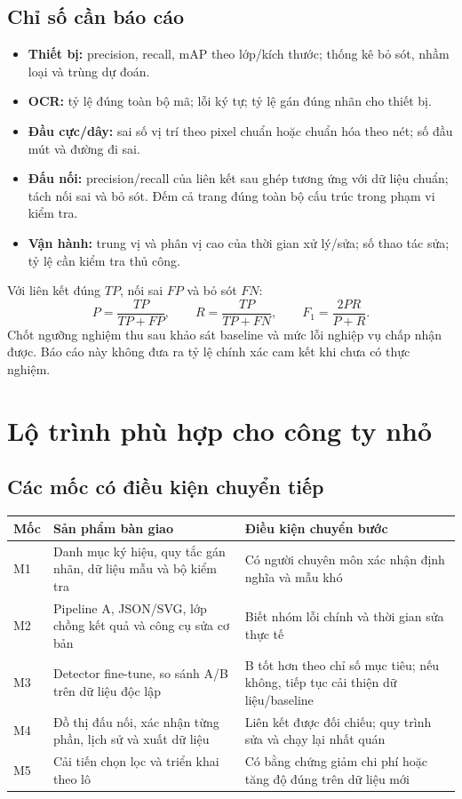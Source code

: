 \documentclass[11pt,a4paper]{article}
\begin{document}
\subsection{Chỉ số cần báo cáo}
\begin{itemize}
\item \textbf{Thiết bị:} precision, recall, mAP theo lớp/kích thước; thống kê bỏ sót, nhầm loại và trùng dự đoán.
\item \textbf{OCR:} tỷ lệ đúng toàn bộ mã; lỗi ký tự; tỷ lệ gán đúng nhãn cho thiết bị.
\item \textbf{Đầu cực/dây:} sai số vị trí theo pixel chuẩn hoặc chuẩn hóa theo nét; số đầu mút và đường đi sai.
\item \textbf{Đấu nối:} precision/recall của liên kết sau ghép tương ứng với dữ liệu chuẩn; tách nối sai và bỏ sót. Đếm cả trang đúng toàn bộ cấu trúc trong phạm vi kiểm tra.
\item \textbf{Vận hành:} trung vị và phân vị cao của thời gian xử lý/sửa; số thao tác sửa; tỷ lệ cần kiểm tra thủ công.
\end{itemize}

Với liên kết đúng $TP$, nối sai $FP$ và bỏ sót $FN$:
\[P=\frac{TP}{TP+FP},\qquad R=\frac{TP}{TP+FN},\qquad F_1=\frac{2PR}{P+R}.\]
Chốt ngưỡng nghiệm thu sau khảo sát baseline và mức lỗi nghiệp vụ chấp nhận được. Báo cáo này không đưa ra tỷ lệ chính xác cam kết khi chưa có thực nghiệm.

\clearpage
\section{Lộ trình phù hợp cho công ty nhỏ}
\subsection{Các mốc có điều kiện chuyển tiếp}
\begin{tabularx}{\linewidth}{@{}p{18mm}Y Y@{}}
\toprule
\textbf{Mốc} & \textbf{Sản phẩm bàn giao} & \textbf{Điều kiện chuyển bước}\\\midrule
M1 & Danh mục ký hiệu, quy tắc gán nhãn, dữ liệu mẫu và bộ kiểm tra & Có người chuyên môn xác nhận định nghĩa và mẫu khó\\
M2 & Pipeline A, JSON/SVG, lớp chồng kết quả và công cụ sửa cơ bản & Biết nhóm lỗi chính và thời gian sửa thực tế\\
M3 & Detector fine-tune, so sánh A/B trên dữ liệu độc lập & B tốt hơn theo chỉ số mục tiêu; nếu không, tiếp tục cải thiện dữ liệu/baseline\\
M4 & Đồ thị đấu nối, xác nhận từng phần, lịch sử và xuất dữ liệu & Liên kết được đối chiếu; quy trình sửa và chạy lại nhất quán\\
M5 & Cải tiến chọn lọc và triển khai theo lô & Có bằng chứng giảm chi phí hoặc tăng độ đúng trên dữ liệu mới\\\bottomrule
\end{tabularx}
\end{document}
